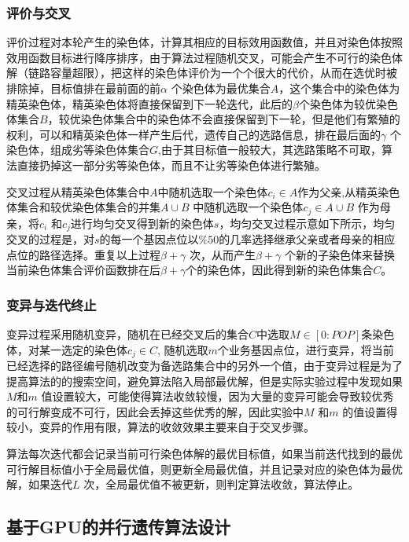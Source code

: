\subsubsection{评价与交叉}
评价过程对本轮产生的染色体，计算其相应的目标效用函数值，并且对染色体按照效用函数目标进行降序排序，由于算法过程随机交叉，可能会产生不可行的染色体解（链路容量超限），把这样的染色体评价为一个个很大的代价，从而在选优时被排除掉，目标值排在最前面的前$\alpha$ 个染色体为最优集合$A$，这个集合中的染色体为精英染色体，精英染色体将直接保留到下一轮迭代，此后的$\beta$个染色体为较优染色体集合$B$，较优染色体集合中的染色体不会直接保留到下一轮，但是他们有繁殖的权利，可以和精英染色体一样产生后代，遗传自己的选路信息，排在最后面的$\gamma$ 个染色体，组成劣等染色体集合$G$,由于其目标值一般较大，其选路策略不可取，算法直接扔掉这一部分劣等染色体，而且不让劣等染色体进行繁殖。

交叉过程从精英染色体集合中$A$中随机选取一个染色体$c_i \in A$作为父亲,从精英染色体集合和较优染色体集合的并集$A \cup B$ 中随机选取一个染色体$c_j \in A \cup B$ 作为母亲，将$c_i$ 和$c_j$进行均匀交叉得到新的染色体$s$，均匀交叉过程示意如下所示，均匀交叉的过程是，对$s$的每一个基因点位以$\%50$的几率选择继承父亲或者母亲的相应点位的路径选择。重复以上过程$\beta+\gamma$ 次，从而产生$\beta+\gamma$ 个新的子染色体来替换当前染色体集合评价函数排在后$\beta+\gamma$个的染色体，因此得到新的染色体集合$C$。
\subsubsection{变异与迭代终止}
变异过程采用随机变异，随机在已经交叉后的集合$C$中选取$M \in [0:POP]$条染色体，对某一选定的染色体$c_j \in C$, 随机选取$m$个业务基因点位，进行变异，将当前已经选择的路径编号随机改变为备选路集合中的另外一个值，由于变异过程是为了提高算法的的搜索空间，避免算法陷入局部最优解，但是实际实验过程中发现如果$M$和$m$ 值设置较大，可能使得算法收敛较慢，因为大量的变异可能会导致较优秀的可行解变成不可行，因此会丢掉这些优秀的解，因此实验中$M$ 和$m$ 的值设置得较小，变异的作用有限，算法的收敛效果主要来自于交叉步骤。

算法每次迭代都会记录当前可行染色体解的最优目标值，如果当前迭代找到的最优可行解目标值小于全局最优值，则更新全局最优值，并且记录对应的染色体为最优解，如果迭代$L$ 次，全局最优值不被更新，则判定算法收敛，算法停止。
\subsection{基于GPU的并行遗传算法设计}
